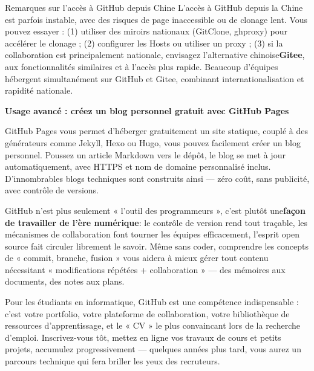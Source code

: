 \begin{tcbinfo}{Remarques sur l'accès à GitHub depuis Chine}
L’accès à GitHub depuis la Chine est parfois instable, avec des risques de page inaccessible ou de clonage lent. Vous pouvez essayer : (1) utiliser des miroirs nationaux (GitClone, ghproxy) pour accélérer le clonage ; (2) configurer les Hosts ou utiliser un proxy ; (3) si la collaboration est principalement nationale, envisagez l’alternative chinoise\textbf{Gitee}, aux fonctionnalités similaires et à l’accès plus rapide. Beaucoup d’équipes hébergent simultanément sur GitHub et Gitee, combinant internationalisation et rapidité nationale.

\end{tcbinfo}

\textbf{Usage avancé : créez un blog personnel gratuit avec GitHub Pages}\par

GitHub Pages vous permet d'héberger gratuitement un site statique, couplé à des générateurs comme Jekyll, Hexo ou Hugo, vous pouvez facilement créer un blog personnel. Poussez un article Markdown vers le dépôt, le blog se met à jour automatiquement, avec HTTPS et nom de domaine personnalisé inclus. D'innombrables blogs techniques sont construits ainsi — zéro coût, sans publicité, avec contrôle de versions.


GitHub n’est plus seulement « l’outil des programmeurs », c’est plutôt une\textbf{façon de travailler de l’ère numérique}: le contrôle de version rend tout traçable, les mécanismes de collaboration font tourner les équipes efficacement, l’esprit open source fait circuler librement le savoir. Même sans coder, comprendre les concepts de « commit, branche, fusion » vous aidera à mieux gérer tout contenu nécessitant « modifications répétées + collaboration » — des mémoires aux documents, des notes aux plans.

Pour les étudiants en informatique, GitHub est une compétence indispensable : c'est votre portfolio, votre plateforme de collaboration, votre bibliothèque de ressources d'apprentissage, et le « CV » le plus convaincant lors de la recherche d'emploi. Inscrivez-vous tôt, mettez en ligne vos travaux de cours et petits projets, accumulez progressivement — quelques années plus tard, vous aurez un parcours technique qui fera briller les yeux des recruteurs.

